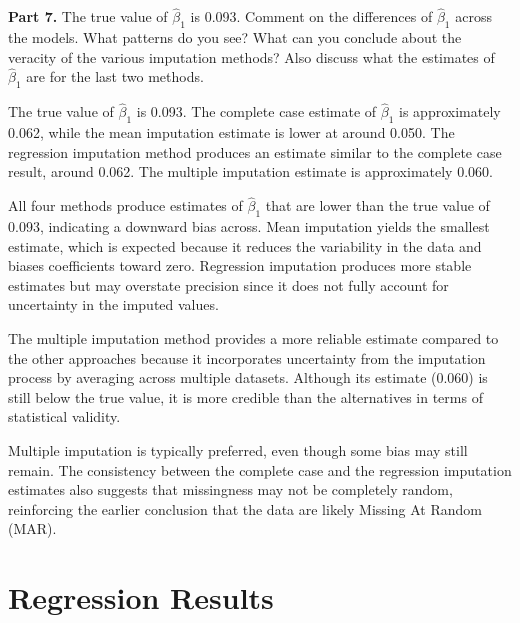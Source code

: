 \documentclass{article}
\begin{document}
\textbf{Part 7. }The true value of  $\hat{\beta}_1$ is 0.093. Comment on the differences of $\hat{\beta}_1$ across the models. What patterns do you see? What can you conclude about the veracity of the various imputation methods? Also discuss what the estimates of $\hat{\beta}_1$ are for the last two methods.

The true value of $\hat{\beta}_1$ is 0.093.  The complete case estimate of $\hat{\beta}_1$ is approximately 0.062, while the mean imputation estimate is lower at around 0.050. The regression imputation method produces an estimate similar to the complete case result, around 0.062. The multiple imputation estimate is approximately 0.060.

All four methods produce estimates of $\hat{\beta}_1$ that are lower than the true value of 0.093, indicating a downward bias across. Mean imputation yields the smallest estimate, which is expected because it reduces the variability in the data and biases coefficients toward zero. Regression imputation produces more stable estimates but may overstate precision since it does not fully account for uncertainty in the imputed values.

The multiple imputation method provides a more reliable estimate compared to the other approaches because it incorporates uncertainty from the imputation process by averaging across multiple datasets. Although its estimate (0.060) is still below the true value, it is more credible than the alternatives in terms of statistical validity.

Multiple imputation is typically preferred, even though some bias may still remain. The consistency between the complete case and the regression imputation estimates also suggests that missingness may not be completely random, reinforcing the earlier conclusion that the data are likely Missing At Random (MAR).
\section*{Regression Results}
\end{document}
